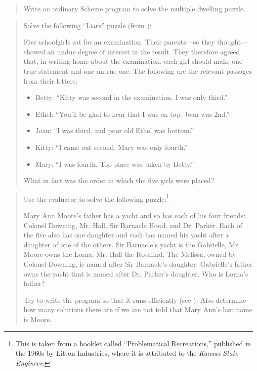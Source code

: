 \begin{quote}
 Write an ordinary Scheme program
to solve the multiple dwelling puzzle.
\end{quote}

\begin{quote}
 Solve the following ``Liars''
puzzle (from ):

Five schoolgirls sat for an examination.  Their parents---so they
thought---showed an undue degree of interest in the result.  They therefore
agreed that, in writing home about the examination, each girl should make one
true statement and one untrue one.  The following are the relevant passages
from their letters:

\begin{itemize}

\item
Betty: ``Kitty was second in the examination.  I was only third.''

\item
Ethel: ``You'll be glad to hear that I was on top.  Joan was 2nd.''

\item
Joan: ``I was third, and poor old Ethel was bottom.''

\item
Kitty: ``I came out second.  Mary was only fourth.''

\item
Mary: ``I was fourth.  Top place was taken by Betty.''

\end{itemize}

What in fact was the order in which the five girls were placed?
\end{quote}

\begin{quote}
 Use the  evaluator to
solve the following puzzle:\footnote{This is taken from a booklet called
``Problematical Recreations,'' published in the 1960s by Litton Industries,
where it is attributed to the \textit{Kansas State Engineer}.}

Mary Ann Moore's father has a yacht and so has each of his four friends:
Colonel Downing, Mr. Hall, Sir Barnacle Hood, and Dr.  Parker.  Each of the
five also has one daughter and each has named his yacht after a daughter of one
of the others.  Sir Barnacle's yacht is the Gabrielle, Mr. Moore owns the
Lorna; Mr. Hall the Rosalind.  The Melissa, owned by Colonel Downing, is named
after Sir Barnacle's daughter.  Gabrielle's father owns the yacht that is named
after Dr.  Parker's daughter.  Who is Lorna's father?

Try to write the program so that it runs efficiently (see ).
Also determine how many solutions there are if we are not told that Mary Ann's
last name is Moore.
\end{quote}

